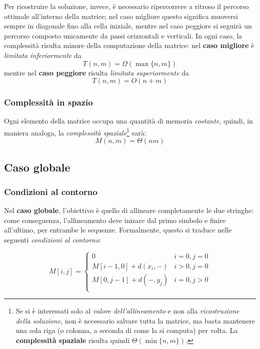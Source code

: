     Per ricostruire la soluzione, invece, è necessario ripercorrere a ritroso il percorso ottimale all'interno della matrice; nel caso migliore questo significa muoversi sempre in diagonale fino alla cella iniziale, mentre nel caso peggiore si seguirà un percorso composto unicamente da passi orizzontali e verticali. In ogni caso, la complessità risulta minore della computazione della matrice: nel \textbf{caso migliore} è \emph{limitata inferiormente} da
    \begin{equation*}
        T(n, m) = \Omega(\max\{n, m\})
    \end{equation*}
    mentre nel \textbf{caso peggiore} risulta \emph{limitata superiormente} da
    \begin{equation*}
        T(n, m) = O(n + m)
    \end{equation*}
    
\subsubsection{Complessità in spazio}
    Ogni elemento della matrice occupa una quantità di memoria \emph{costante}, quindi, in maniera analoga, la \emph{complessità spaziale}\footnote{Se si è interessati solo al \emph{valore dell'allineamento} e non alla \emph{ricostruzione della soluzione}, non è necessario salvare tutta la matrice, ma basta mantenere una sola riga (o colonna, a seconda di come la si computa) per volta. La \textbf{complessità spaziale} risulta quindi $\Theta(\min \{n, m \})$.} sarà:
    \begin{equation*}
        M(n, m) = \Theta(nm)
    \end{equation*}

\subsection{Caso globale}
\subsubsection{Condizioni al contorno}
    
    Nel \textbf{caso globale}, l'obiettivo è quello di allineare completamente le due stringhe: come conseguenza, l'allineamento deve inizare dal primo simbolo e finire all'ultimo, per entrambe le sequenze. Formalmente, questo si traduce nelle seguenti \emph{condizioni al contorno}:

    \begin{equation}
        M[i, j] = \begin{cases}
            0 & i = 0, j = 0 \\
            M[i-1, 0] + d(x_i, -) & i > 0, j = 0\\
            M[0, j-1] + d(-, y_j) & i = 0, j > 0\\
        \end{cases}
    \end{equation}

